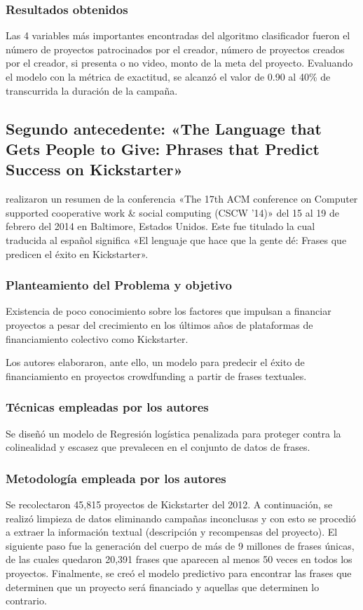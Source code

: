 \subsubsection{Resultados obtenidos}
Las 4 variables más importantes encontradas del algoritmo clasificador fueron el número de proyectos patrocinados por el creador, número de proyectos creados por el creador, si presenta o no video, monto de la meta del proyecto. Evaluando el modelo con la métrica de exactitud, se alcanzó el valor de 0.90 al 40\% de transcurrida la duración de la campaña.

\subsection{Segundo antecedente: «The Language that Gets People to Give: Phrases that Predict Success on Kickstarter» \citep*{pr_mitra2014phrases}}
\citeauthor{pr_mitra2014phrases} realizaron un resumen de la conferencia «The 17th ACM conference on Computer supported cooperative work \& social computing (CSCW '14)» del 15 al 19 de febrero del 2014 en Baltimore, Estados Unidos. Este fue titulado  la cual traducida al español significa «El lenguaje que hace que la gente dé: Frases que predicen el éxito en Kickstarter».

\subsubsection{Planteamiento del Problema y objetivo}
Existencia de poco conocimiento sobre los factores que impulsan a financiar proyectos a pesar del crecimiento en los últimos años de plataformas de financiamiento colectivo como Kickstarter.

Los autores elaboraron, ante ello, un modelo para predecir el éxito de financiamiento en proyectos crowdfunding a partir de frases textuales.

\subsubsection{Técnicas empleadas por los autores}
Se diseñó un modelo de Regresión logística penalizada para proteger contra la colinealidad y escasez que prevalecen en el conjunto de datos de frases.

\subsubsection{Metodología empleada por los autores}
Se recolectaron 45,815 proyectos de Kickstarter del 2012. A continuación, se realizó limpieza de datos eliminando campañas inconclusas y con esto se procedió a extraer la información textual (descripción y recompensas del proyecto). El siguiente paso fue la generación del cuerpo de más de 9 millones de frases únicas, de las cuales quedaron 20,391 frases que aparecen al menos 50 veces en todos los proyectos. Finalmente, se creó el modelo predictivo para encontrar las frases que determinen que un proyecto será financiado y aquellas que determinen lo contrario.

